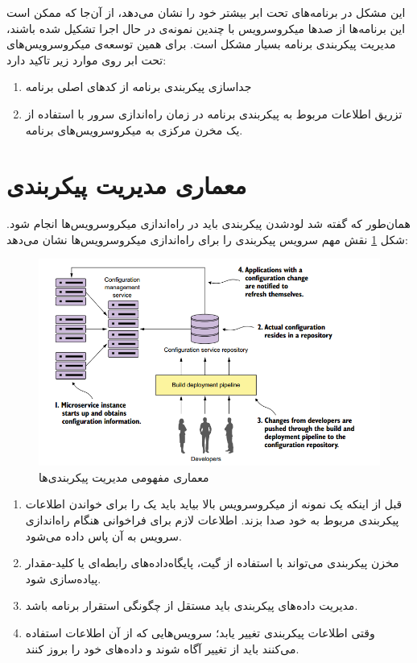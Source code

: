 \documentclass[a4paper,12pt]{book}
\begin{document}
	این مشکل در برنامه‌های تحت ابر بیشتر خود را نشان می‌دهد، از آن‌جا که ممکن است این برنامه‌ها از صدها میکروسرویس با چندین نمونه‌ی در حال اجرا تشکیل شده باشند، مدیریت پیکربندی برنامه بسیار مشکل است. برای همین توسعه‌ی میکروسرویس‌های تحت ابر روی موارد زیر تاکید دارد:
	\begin{enumerate}
		\item جداسازی پیکربندی برنامه از کدهای اصلی برنامه
		\item تزریق اطلاعات مربوط به پیکربندی برنامه در زمان راه‌اندازی سرور با استفاده از یک مخرن مرکزی به میکروسرویس‌‌های برنامه.
	\end{enumerate}
	
	
	\section{معماری مدیریت پیکربندی}
	
	همان‌طور که گفته شد لودشدن پیکربندی باید در راه‌‌اندازی میکروسرویس‌ها انجام شود. 
	شکل \ref{fig:2} نقش مهم سرویس پیکربندی را برای راه‌اندازی میکروسرویس‌ها نشان می‌دهد:
	
	\begin{figure}[h]
		\centering
		\includegraphics[width=\textwidth]{2.png}
		\caption{معماری مفهومی مدیریت پیکربندی‌ها}
		\label{fig:2}
	\end{figure}
	
	\begin{enumerate}
		\item
		قبل از اینکه یک نمونه از میکروسرویس بالا بیاید باید یک  را برای خواندن اطلاعات پیکربندی مربوط به خود صدا بزند. اطلاعات لازم برای فراخوانی  هنگام راه‌اندازی سرویس به آن پاس داده می‌شود.
		\item
		مخزن پیکربندی می‌تواند با استفاده از گیت، پایگاه‌داده‌های رابطه‌ای یا کلید-مقدار پیاده‌سازی شود.
		\item
		مدیریت داده‌های پیکربندی باید مستقل از چگونگی استقرار برنامه باشد.
		\item
		وقتی اطلاعات پیکربندی تغییر یابد؛ سرویس‌هایی که از آن اطلاعات استفاده می‌کنند باید از تغییر آگاه شوند و داده‌های خود را بروز کنند.
	\end{enumerate}
	
\end{document}
